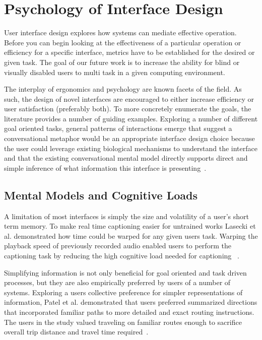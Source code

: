 \section{                  Psychology of Interface Design                    }

User interface design explores how systems can mediate effective operation.
Before you can begin looking at the effectiveness of a particular operation or
efficiency for a specific interface, metrics have to be established for the
desired or given task. The goal of our future work is to increase the ability
for blind or visually disabled users to multi task in a given computing
environment.

The interplay of ergonomics and psychology are known facets of the field. As
such, the design of novel interfaces are encouraged to either increase
efficiency or user satisfaction (preferably both). To more concretely enumerate
the goals, the literature provides a number of guiding examples.  Exploring a
number of different goal oriented tasks, general patterns of interactions
emerge that suggest a conversational metaphor would be an appropriate
interface design choice because the user could leverage existing biological
mechanisms to understand the interface and that the existing conversational
mental model directly supports direct and simple inference of what information
this interface is presenting~\cite{kieras1984role}.




\subsection{                  Mental Models and Cognitive Loads              }

A limitation of most interfaces is simply the size and volatility of a user's
short term memory.  To make real time captioning easier for untrained works
Lasecki et al. demonstrated how time could be warped for any given users task.
Warping the playback speed of previously recorded audio enabled users to perform
the captioning task by reducing the high cognitive load needed for captioning
~\cite{lasecki2013warping}.

Simplifying information is not only beneficial for goal oriented and task driven
processes, but they are also empirically preferred by users of a number of
systems. Exploring a users collective preference for simpler  representations of
information, Patel et al. demonstrated that users preferred summarized
directions that incorporated familiar paths to more detailed and exact routing
instructions. The users in the study valued traveling on  familiar routes enough
to sacrifice overall trip distance and travel time
required~\cite{patel2006personalizing}.

